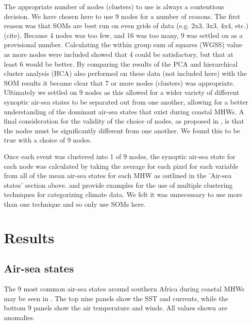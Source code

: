 \documentclass[a4paper,10pt,review]{elsarticle}
\begin{document}
The appropriate number of nodes (clusters) to use is always a contentious decision. We have chosen here to use 9 nodes for a number of reasons. The first reason was that SOMs are best run on even grids of data (e.g. 2x3, 3x3, 4x4, etc.) (cite). Because 4 nodes was too few, and 16 was too many, 9 was settled on as a provisional number. Calculating the within group sum of squares (WGSS) value as more nodes were included showed that 4 could be satisfactory, but that at least 6 would be better. By comparing the results of the PCA and hierarchical cluster analysis (HCA) also performed on these data (not included here) with the SOM results it became clear that 7 or more nodes (clusters) was appropriate. Ultimately we settled on 9 nodes as this allowed for a wider variety of different synoptic air-sea states to be separated out from one another, allowing for a better understanding of the dominant air-sea states that exist during coastal MHWs. A final consideration for the validity of the choice of nodes, as proposed in \citet{Johnson2013}, is that the nodes must be significantly different from one another. We found this to be true with a choice of 9 nodes.

Once each event was clustered into 1 of 9 nodes, the synoptic air-sea state for each node was calculated by taking the average for each pixel for each variable from all of the mean air-sea states for each MHW as outlined in the 'Air-sea states' section above. \citet{Ambroise2000} and \citet{Ramos2001} provide examples for the use of multiple clustering techniques for categorizing climate data. We felt it was unnecessary to use more than one technique and so only use SOMs here.

\section{Results}
\subsection{Air-sea states}
The 9 most common air-sea states around southern Africa during coastal MHWs may be seen in . The top nine panels show the SST and currents, while the bottom 9 panels show the air temperature and winds. All values shown are anomalies.
\end{document}
